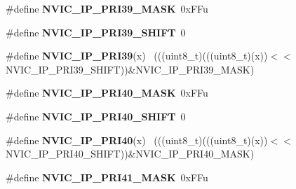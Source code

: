 \begin{DoxyCompactItemize}
\item 
\hypertarget{group___n_v_i_c___register___masks_ga8814435b4a4980b231b593bfac1a967c}{}\#define {\bfseries N\+V\+I\+C\+\_\+\+I\+P\+\_\+\+P\+R\+I39\+\_\+\+M\+A\+S\+K}~0x\+F\+Fu\label{group___n_v_i_c___register___masks_ga8814435b4a4980b231b593bfac1a967c}

\item 
\hypertarget{group___n_v_i_c___register___masks_ga99038e7e0eac2424df606cc22c796dd9}{}\#define {\bfseries N\+V\+I\+C\+\_\+\+I\+P\+\_\+\+P\+R\+I39\+\_\+\+S\+H\+I\+F\+T}~0\label{group___n_v_i_c___register___masks_ga99038e7e0eac2424df606cc22c796dd9}

\item 
\hypertarget{group___n_v_i_c___register___masks_ga9807f4aedf0f0b433cc26ca1d3cf6474}{}\#define {\bfseries N\+V\+I\+C\+\_\+\+I\+P\+\_\+\+P\+R\+I39}(x)                                              ~(((uint8\+\_\+t)(((uint8\+\_\+t)(x))$<$$<$N\+V\+I\+C\+\_\+\+I\+P\+\_\+\+P\+R\+I39\+\_\+\+S\+H\+I\+F\+T))\&N\+V\+I\+C\+\_\+\+I\+P\+\_\+\+P\+R\+I39\+\_\+\+M\+A\+S\+K)\label{group___n_v_i_c___register___masks_ga9807f4aedf0f0b433cc26ca1d3cf6474}

\item 
\hypertarget{group___n_v_i_c___register___masks_gab8a1211c281be4c39460f09a1f814558}{}\#define {\bfseries N\+V\+I\+C\+\_\+\+I\+P\+\_\+\+P\+R\+I40\+\_\+\+M\+A\+S\+K}~0x\+F\+Fu\label{group___n_v_i_c___register___masks_gab8a1211c281be4c39460f09a1f814558}

\item 
\hypertarget{group___n_v_i_c___register___masks_gaf798b455dac2cafb5ee5a3b0ff7c8a52}{}\#define {\bfseries N\+V\+I\+C\+\_\+\+I\+P\+\_\+\+P\+R\+I40\+\_\+\+S\+H\+I\+F\+T}~0\label{group___n_v_i_c___register___masks_gaf798b455dac2cafb5ee5a3b0ff7c8a52}

\item 
\hypertarget{group___n_v_i_c___register___masks_ga78538bed78d9b7cb308cfc86ddd2a240}{}\#define {\bfseries N\+V\+I\+C\+\_\+\+I\+P\+\_\+\+P\+R\+I40}(x)                                              ~(((uint8\+\_\+t)(((uint8\+\_\+t)(x))$<$$<$N\+V\+I\+C\+\_\+\+I\+P\+\_\+\+P\+R\+I40\+\_\+\+S\+H\+I\+F\+T))\&N\+V\+I\+C\+\_\+\+I\+P\+\_\+\+P\+R\+I40\+\_\+\+M\+A\+S\+K)\label{group___n_v_i_c___register___masks_ga78538bed78d9b7cb308cfc86ddd2a240}

\item 
\hypertarget{group___n_v_i_c___register___masks_ga34c24f2adc1cb740a6ea39ef65d5ffed}{}\#define {\bfseries N\+V\+I\+C\+\_\+\+I\+P\+\_\+\+P\+R\+I41\+\_\+\+M\+A\+S\+K}~0x\+F\+Fu\label{group___n_v_i_c___register___masks_ga34c24f2adc1cb740a6ea39ef65d5ffed}


\end{DoxyCompactItemize}
